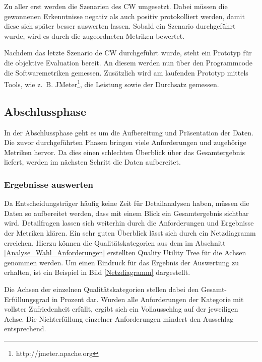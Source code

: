 Zu aller erst werden die Szenarien des \ac{CW} umgesetzt. Dabei müssen die gewonnenen Erkenntnisse negativ als auch positiv protokolliert werden, damit diese sich später besser auswerten lassen. Sobald ein Szenario durchgeführt wurde, wird es durch die zugeordneten Metriken bewertet.

Nachdem das letzte Szenario de \ac{CW} durchgeführt wurde, steht ein Prototyp für die objektive Evaluation bereit. An diesem werden nun über den Programmcode die Softwaremetriken gemessen. Zusätzlich wird am laufenden Prototyp mittels Tools, wie z.~B. JMeter\footnote{http://jmeter.apache.org}, die Leistung sowie der Durchsatz gemessen.

\subsection{Abschlussphase}


In der Abschlussphase geht es um die Aufbereitung und Präsentation der Daten. Die zuvor durchgeführten Phasen bringen viele Anforderungen und zugehörige Metriken hervor. Da dies einen schlechten Überblick über das Gesamtergebnis liefert, werden im nächsten Schritt die Daten aufbereitet.

\subsubsection{Ergebnisse auswerten}

Da Entscheidungsträger häufig keine Zeit für Detailanalysen haben, müssen die Daten so aufbereitet werden, dass mit einem Blick ein Gesamtergebnis sichtbar wird. Detailfragen lassen sich weiterhin durch die Anforderungen und Ergebnisse der Metriken klären. Ein sehr guten Überblick lässt sich durch ein Netzdiagramm erreichen. Hierzu können die Qualitätskategorien aus dem im Abschnitt \ref{Analyse_Wahl_Anforderungen} erstellten Quality Utility Tree für die Achsen genommen werden. Um einen Eindruck für das Ergebnis der Auswertung zu erhalten, ist ein Beispiel in Bild \ref{Netzdiagramm} dargestellt.


Die Achsen der einzelnen Qualitätskategorien stellen dabei den Gesamt-Erfüllungsgrad in Prozent dar. Wurden alle Anforderungen der Kategorie mit vollster Zufriedenheit erfüllt, ergibt sich ein Vollausschlag auf der jeweiligen Achse. Die Nichterfüllung einzelner Anforderungen mindert den Ausschlag entsprechend.

